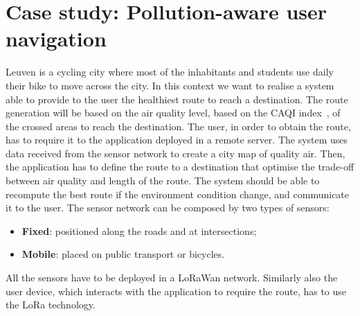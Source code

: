 \section{Case study: Pollution-aware user navigation}
\label{sec:case-staudyLoRa}


Leuven is a cycling city where most of the inhabitants and students use daily their bike to move across the city. 
In this context we want to realise a system able to provide to the user the healthiest route to reach a destination. 
The route generation will be based on the air quality level, based on the CAQI index~\cite{CAQI}, of the crossed areas to reach the destination. 
The user, in order to obtain the route, has to require it to the application deployed in a remote server.
The system uses data received from the sensor network to create a city map of quality air.
Then, the application has to define the route to a destination that optimise the trade-off between air quality and length of the route.
The system should be able to recompute the best route if the environment condition change, and communicate it to the user.
The sensor network can be composed by two types of sensors:
\begin{itemize}
    \item \textbf{Fixed}: positioned along the roads and at intersections;
    \item \textbf{Mobile}: placed on public transport or bicycles.
\end{itemize}
All the sensors have to be deployed in a LoRaWan network.
Similarly also the user device, which interacts with the application to require the route, has to use the LoRa technology.

